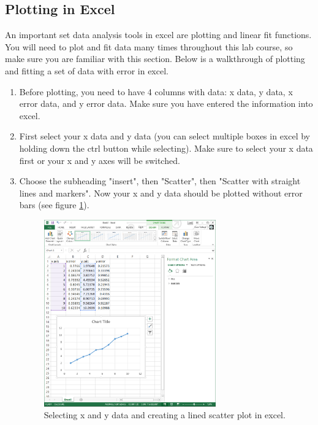 \subsection{Plotting in Excel}
An important set data analysis tools in excel are plotting and linear fit functions. You will need to plot and fit data many times throughout this lab course, so make sure you are familiar with this section. Below is a walkthrough of plotting and fitting a set of data with error in excel. 
\begin{enumerate}
\item Before plotting, you need to have 4 columns with data: x data, y data, x error data, and y error data. Make sure you have entered the information into excel.
\item First select your x data and y data (you can select multiple boxes in excel by holding down the ctrl button while selecting). Make sure to select your x data first or your x and y axes will be switched.
\item Choose the subheading "insert", then "Scatter", then "Scatter with straight lines and markers". Now your x and y data should be plotted without error bars (see figure \ref{fig:excel1}).

\begin{figure}[h!]
\centering
\includegraphics[height=0.4\textheight, width=0.7\textwidth]{./Exp1/pic/image4.png}
\caption{Selecting x and y data and creating a lined scatter plot in excel.}
\label{fig:excel1}
\end{figure}



\end{enumerate}
